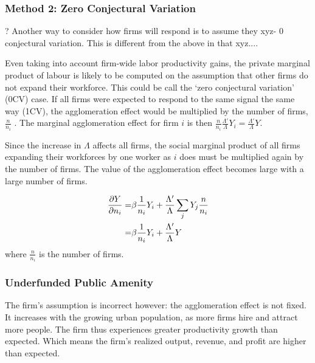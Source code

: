 \subsubsection*{Method 2: Zero Conjectural Variation}

? Another way to consider how firms will respond is to assume they xyz- 0 conjectural variation. This is different from the above in that xyz....

Even taking into account firm-wide labor productivity gains, the private marginal product of labour is likely to be computed on the assumption that other firms do not expand  their workforce. This could be call the `zero conjectural variation' (0CV) case. If all firms  were expected to respond to the same signal the same way (1CV), the agglomeration effect  would be multiplied by the number of firms, $\frac{n }{n_i}$ . The marginal agglomeration effect for firm $i$ is then $\frac{n }{n_i}\frac{\Lambda' }{\Lambda}Y_i =\frac{\Lambda' }{\Lambda}Y$. 

Since the increase in $\Lambda$ affects all firms, the  social marginal product of all firms expanding their  workforces by one worker as $i$ does must be multiplied again by the number of firms. The value of the agglomeration effect  becomes large with a large number of firms. %


%


\begin{eqnarray}
\die{Y}{n_i}=&   \beta\frac{1}{n_i}Y_i    + \frac{\Lambda' }{\Lambda}\sum_j Y_j\frac{n }{n_i} \\
%
		=&   \beta\frac{1}{n_i}Y_i    + \frac{\Lambda' }{\Lambda}Y\\
\end{eqnarray}		
 where $\frac{n }{n_i}$ is the number of firms. 




\subsubsection*{Underfunded Public Amenity}

The firm's assumption is incorrect however: the agglomeration effect is not fixed. It increases with the growing urban population, as more firms hire and attract more people. The firm thus experiences greater productivity growth than expected.%
Which means the firm's realized output, revenue, and profit are higher than expected. %

